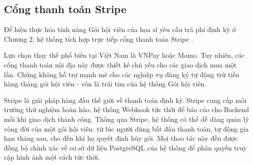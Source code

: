 \subsection{Cổng thanh toán Stripe}

Để hiện thực hóa tính năng Gói hội viên của họa sĩ yêu cầu trả phí định kỳ ở Chương 2, hệ thống tích hợp trực tiếp cổng thanh toán Stripe \cite{stripe}.

Lựa chọn thay thế phổ biến tại Việt Nam là VNPay hoặc Momo. Tuy nhiên, các cổng thanh toán nội địa này được thiết kế chủ yếu cho các giao dịch mua một lần. Chúng không hỗ trợ mạnh mẽ cho các nghiệp vụ đăng ký tự động trừ tiền hàng tháng gói hội viên - vốn là trái tim của hệ thống Gói hội viên.

Stripe là giải pháp hàng đầu thế giới về thanh toán định kỳ. Stripe cung cấp môi trường thử nghiệm hoàn hảo, hệ thống Webhook tức thời để báo cáo cho Backend mỗi khi giao dịch thành công. Thông qua Stripe, hệ thống có thể dễ dàng quản lý vòng đời của một gói hội viên: từ lúc người dùng bắt đầu thanh toán, tự động gia hạn tháng sau, cho đến khi họ quyết định hủy gói. Mọi thao tác này đều được đồng bộ chính xác về cơ sở dữ liệu PostgreSQL của hệ thống để phân quyền truy cập hình ảnh một cách tức thời.
